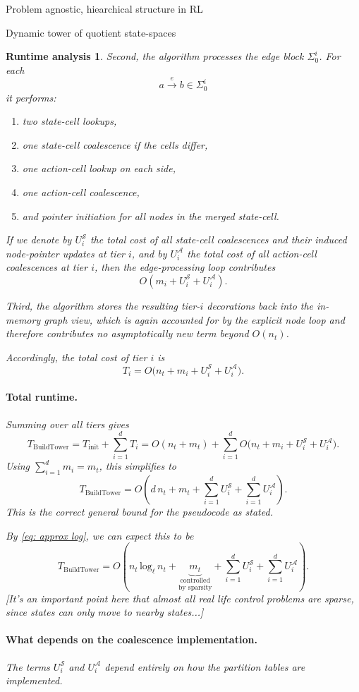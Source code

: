\documentclass[11pt]{article}
\newtheorem{run_analysis}[subsubsection]{Runtime analysis}
\begin{document}
\begin{section}{Problem agnostic, hiearchical structure in RL}
\begin{subsection}{Dynamic tower of quotient state-spaces}
\begin{run_analysis}
Second, the algorithm processes the edge block $\Sigma_0^i$. For each
\[
a\xrightarrow{\ e\ }b\in\Sigma_0^i
\]
it performs:
\begin{enumerate}
    \item two state-cell lookups,
    \item one state-cell coalescence if the cells differ,
    \item one action-cell lookup on each side,
    \item one action-cell coalescence,
    \item and pointer initiation for all nodes in the merged state-cell.
\end{enumerate}
If we denote by
$
U_i^{\mathcal S}
$
the total cost of all state-cell coalescences and their induced node-pointer updates at tier $i$, and by
$
U_i^{\mathcal A}
$
the total cost of all action-cell coalescences at tier $i$, then the edge-processing loop contributes
\[
O(m_i + U_i^{\mathcal S}+U_i^{\mathcal A}).
\]

Third, the algorithm stores the resulting tier-$i$ decorations back into the in-memory graph view, which is again accounted for by the explicit node loop and therefore contributes no asymptotically new term beyond $O(n_t)$.

Accordingly, the total cost of tier $i$ is
\[
T_i = O\bigl(n_t + m_i + U_i^{\mathcal S}+U_i^{\mathcal A}\bigr).
\]

\paragraph{Total runtime.}
Summing over all tiers gives
\[
T_{\mathrm{BuildTower}}
=
T_{\mathrm{init}} + \sum_{i=1}^d T_i
=
O(n_t+m_t)
+
\sum_{i=1}^d O\bigl(n_t + m_i + U_i^{\mathcal S}+U_i^{\mathcal A}\bigr).
\]
Using $\sum_{i=1}^d m_i=m_t$, this simplifies to
\[
T_{\mathrm{BuildTower}}
=
O\!\left(
d\,n_t + m_t + \sum_{i=1}^d U_i^{\mathcal S} + \sum_{i=1}^d U_i^{\mathcal A}
\right).
\]
This is the correct general bound for the pseudocode as stated.

By \eqref{eq: approx log}, we can expect this to be
\[
T_{\mathrm{BuildTower}}
=
O\!\left(
n_t\,\text{log}_{\ell}\,n_{t} + 
\!\!\!\!\!
\underset{\text{by sparsity}}{\underset{\text{controlled}}{\underbrace{m_t}}}
 + \sum_{i=1}^d U_i^{\mathcal S} + \sum_{i=1}^d U_i^{\mathcal A}
\right).
\]
[It's an important point here that almost all real life control problems are sparse, since states can only move to nearby states...]

\paragraph{What depends on the coalescence implementation.}
The terms $
U_i^{\mathcal S}$ and 
$U_i^{\mathcal A}$ depend entirely on how the partition tables are implemented.


\end{run_analysis}
\end{subsection}
\end{section}
\end{document}
